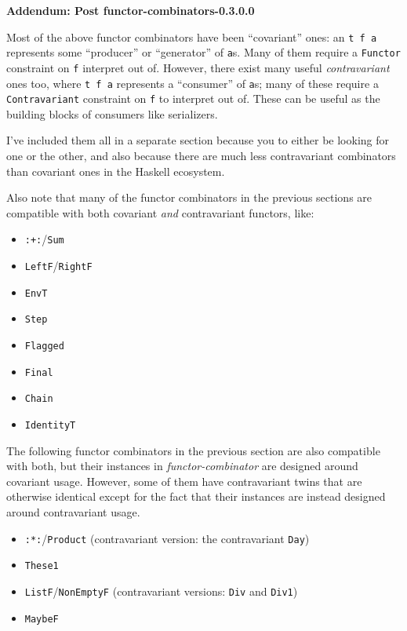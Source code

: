 \documentclass[]{article}
\begin{document}
\textbf{Addendum: Post functor-combinators-0.3.0.0}

Most of the above functor combinators have been ``covariant'' ones: an
\texttt{t\ f\ a} represents some ``producer'' or ``generator'' of \texttt{a}s.
Many of them require a \texttt{Functor} constraint on \texttt{f} interpret out
of. However, there exist many useful \emph{contravariant} ones too, where
\texttt{t\ f\ a} represents a ``consumer'' of \texttt{a}s; many of these require
a \texttt{Contravariant} constraint on \texttt{f} to interpret out of. These can
be useful as the building blocks of consumers like serializers.

I've included them all in a separate section because you to either be looking
for one or the other, and also because there are much less contravariant
combinators than covariant ones in the Haskell ecosystem.

Also note that many of the functor combinators in the previous sections are
compatible with both covariant \emph{and} contravariant functors, like:

\begin{itemize}
\tightlist
\item
  \texttt{:+:}/\texttt{Sum}
\item
  \texttt{LeftF}/\texttt{RightF}
\item
  \texttt{EnvT}
\item
  \texttt{Step}
\item
  \texttt{Flagged}
\item
  \texttt{Final}
\item
  \texttt{Chain}
\item
  \texttt{IdentityT}
\end{itemize}

The following functor combinators in the previous section are also compatible
with both, but their instances in \emph{functor-combinator} are designed around
covariant usage. However, some of them have contravariant twins that are
otherwise identical except for the fact that their instances are instead
designed around contravariant usage.

\begin{itemize}
\tightlist
\item
  \texttt{:*:}/\texttt{Product} (contravariant version: the contravariant
  \texttt{Day})
\item
  \texttt{These1}
\item
  \texttt{ListF}/\texttt{NonEmptyF} (contravariant versions: \texttt{Div} and
  \texttt{Div1})
\item
  \texttt{MaybeF}
\end{itemize}
\end{document}
